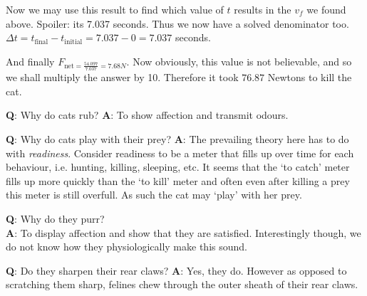 \documentclass{article}
\begin{document}
\begin{multicols}{3}
\begin{minipage}{8cm}
{\begin{minipage}{8cm}
        Now we may use this result to find which value of $t$ results in the $v_f$ we found above. Spoiler: its 7.037 seconds. Thus we now have a solved denominator too. $\Delta t = t_{\text{final}} - t_{\text{initial}} = 7.037 - 0 = 7.037$ seconds.

        And finally $F_{\text{net} = \frac{54.097}{7.037} = 7.68 N}$. Now obviously, this value is not believable, and so we shall multiply the answer by 10. Therefore it took $76.87$ Newtons to kill the cat. 
        \flushright{$\square$}

        

    \end{minipage}
    }

\end{minipage}

\hspace{2.5cm}
    \begin{minipage}{0.5cm}
        \begin{turn}{90}
            \textbf{Q}: Why do cats rub?
            \textbf{A}: To show affection and transmit odours.
        \end{turn}
    \end{minipage}

\hspace{-2.5cm}
\begin{minipage}{8cm}
    \textbf{Q}: Why do cats play with their prey?
    \textbf{A}: The prevailing theory here has to do with \emph{readiness}. Consider readiness to be a meter that fills up over time for each behaviour, i.e. hunting, killing, sleeping, etc. It seems that the `to catch' meter fills up more quickly than the `to kill' meter and often even after killing a prey this meter is still overfull. As such the cat may `play' with her prey.\\
    \begin{turn}{90}
    \begin{minipage}[b]{6.5cm}
        \flushleft
        \textbf{Q}: Why do they purr?\\
        \vspace{3cm}
        \flushright
        \textbf{A}: To display affection and show that they are satisfied. Interestingly though, we do not know how they physiologically make this sound.
    \end{minipage}
    \end{turn}
    \begin{minipage}[b]{7cm}
        \textbf{Q}: Do they sharpen their rear claws?
        \textbf{A}: Yes, they do. However as opposed to scratching them sharp, felines chew through the outer sheath of their rear claws.
    \end{minipage}
\end{minipage}


\end{multicols}
\end{document}
